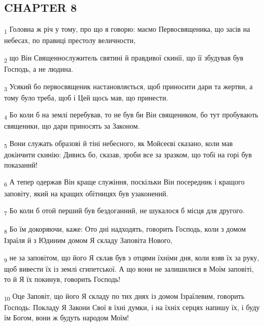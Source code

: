 \subsection{CHAPTER 8}
\begin{tcolorbox}
\textsubscript{1} Головна ж річ у тому, про що я говорю: маємо Первосвященика, що засів на небесах, по правиці престолу величности,
\end{tcolorbox}
\begin{tcolorbox}
\textsubscript{2} що Він Священнослужитель святині й правдивої скинії, що її збудував був Господь, а не людина.
\end{tcolorbox}
\begin{tcolorbox}
\textsubscript{3} Усякий бо первосвященик настановляється, щоб приносити дари та жертви, а тому було треба, щоб і Цей щось мав, що принести.
\end{tcolorbox}
\begin{tcolorbox}
\textsubscript{4} Бо коли б на землі перебував, то не був би Він священиком, бо тут пробувають священики, що дари приносять за Законом.
\end{tcolorbox}
\begin{tcolorbox}
\textsubscript{5} Вони служать образові й тіні небесного, як Мойсеєві сказано, коли мав докінчити скинію: Дивись бо, сказав, зроби все за зразком, що тобі на горі був показаний!
\end{tcolorbox}
\begin{tcolorbox}
\textsubscript{6} А тепер одержав Він краще служіння, поскільки Він посередник і кращого заповіту, який на кращих обітницях був узаконений.
\end{tcolorbox}
\begin{tcolorbox}
\textsubscript{7} Бо коли б отой перший був бездоганний, не шукалося б місця для другого.
\end{tcolorbox}
\begin{tcolorbox}
\textsubscript{8} Бо їм докоряючи, каже: Ото дні надходять, говорить Господь, коли з домом Ізраїля й з Юдиним домом Я складу Заповіта Нового,
\end{tcolorbox}
\begin{tcolorbox}
\textsubscript{9} не за заповітом, що його Я склав був з отцями їхніми дня, коли взяв їх за руку, щоб вивести їх із землі єгипетської. А що вони не залишилися в Моїм заповіті, то й Я їх покинув, говорить Господь!
\end{tcolorbox}
\begin{tcolorbox}
\textsubscript{10} Оце Заповіт, що його Я складу по тих днях із домом Ізраїлевим, говорить Господь: Покладу Я Закони Свої в їхні думки, і на їхніх серцях напишу їх, і буду їм Богом, вони ж будуть народом Моїм!
\end{tcolorbox}
